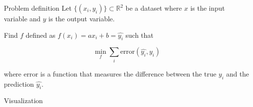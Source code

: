 \begin{frame}{Problem definition}
  Let $\{( x_i , y_i)\} \subset \mathbb{R}^2$ be a dataset where $x$ is the input variable and $y$ is the output variable.

  Find $f$ defined as $f(x_i) = ax_i + b = \hat{y_i}$ such that

  \[
    \min_{f} \sum_i \text{error}(\hat{y_i}, y_i)
  \]

  where $\text{error}$ is a function that measures the difference between the true $y_i$ and the prediction $\hat{y_i}$.
\end{frame}

\begin{frame}{Visualization}
\end{frame}
